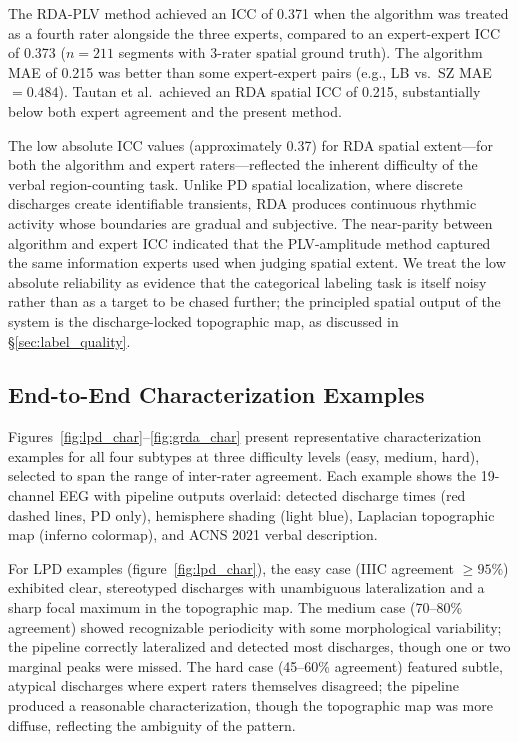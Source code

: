 \documentclass{iopjournal}
\begin{document}
The RDA-PLV method achieved an ICC of 0.371 when the algorithm was treated as a fourth rater alongside the three experts, compared to an expert-expert ICC of 0.373 ($n = 211$ segments with 3-rater spatial ground truth). The algorithm MAE of 0.215 was better than some expert-expert pairs (e.g., LB vs.\ SZ MAE $= 0.484$). Tautan et al.\ achieved an RDA spatial ICC of 0.215, substantially below both expert agreement and the present method.

The low absolute ICC values (approximately 0.37) for RDA spatial extent---for both the algorithm and expert raters---reflected the inherent difficulty of the verbal region-counting task. Unlike PD spatial localization, where discrete discharges create identifiable transients, RDA produces continuous rhythmic activity whose boundaries are gradual and subjective. The near-parity between algorithm and expert ICC indicated that the PLV-amplitude method captured the same information experts used when judging spatial extent. We treat the low absolute reliability as evidence that the categorical labeling task is itself noisy rather than as a target to be chased further; the principled spatial output of the system is the discharge-locked topographic map, as discussed in \S\ref{sec:label_quality}.

\subsection{End-to-End Characterization Examples}
\label{sec:examples}

Figures~\ref{fig:lpd_char}--\ref{fig:grda_char} present representative characterization examples for all four subtypes at three difficulty levels (easy, medium, hard), selected to span the range of inter-rater agreement. Each example shows the 19-channel EEG with pipeline outputs overlaid: detected discharge times (red dashed lines, PD only), hemisphere shading (light blue), Laplacian topographic map (inferno colormap), and ACNS 2021 verbal description.

For LPD examples (figure~\ref{fig:lpd_char}), the easy case (IIIC agreement $\geq 95\%$) exhibited clear, stereotyped discharges with unambiguous lateralization and a sharp focal maximum in the topographic map. The medium case (70--80\% agreement) showed recognizable periodicity with some morphological variability; the pipeline correctly lateralized and detected most discharges, though one or two marginal peaks were missed. The hard case (45--60\% agreement) featured subtle, atypical discharges where expert raters themselves disagreed; the pipeline produced a reasonable characterization, though the topographic map was more diffuse, reflecting the ambiguity of the pattern.
\end{document}
